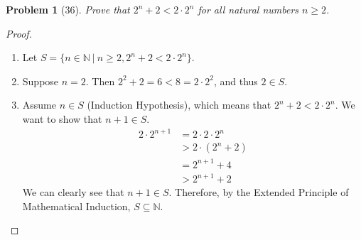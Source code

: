 \documentclass{article}
\theoremstyle{problem}
\newtheorem{prob}{Problem}
\theoremstyle{plain}
\begin{document}
  \begin{prob}[36]
    Prove that $2^n + 2 < 2 \cdot 2^n$ for all natural numbers $n \geq 2$.
  \end{prob}
  \begin{proof}\
    \begin{enumerate}
      \item Let $S = \{n \in \mathbb{N}\ |\ n \geq 2, 2^n + 2 < 2 \cdot 2^n\}$.
      \item Suppose $n = 2$. Then $2^2 + 2 = 6 < 8 = 2 \cdot 2^2$, and thus $2 \in S$.
      \item Assume $n \in S$ (Induction Hypothesis), which means that $2^n + 2 < 2 \cdot 2^n$. We want to show that $n + 1 \in S$.
        \begin{align*}
          2 \cdot 2^{n+1} &= 2 \cdot 2 \cdot 2^n\\
                         &> 2 \cdot (2^n + 2)\tag*{(Induction Hypothesis)}\\
                         &= 2^{n+1} + 4\\
                         &> 2^{n+1} + 2
        \end{align*}
        We can clearly see that $n + 1 \in S$. Therefore, by the Extended Principle of Mathematical Induction, $S \subseteq \mathbb{N}$.
      \end{enumerate}
  \end{proof}
\end{document}
